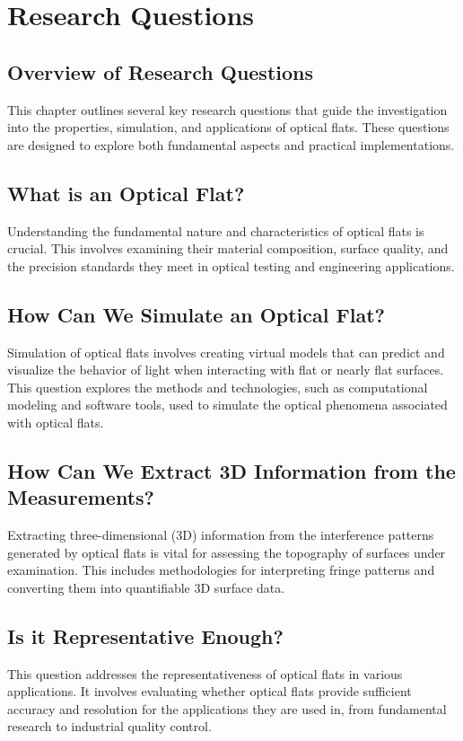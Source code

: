 \documentclass[../main.tex]{subfiles}
\begin{document}
\chapter{Research Questions}

\section{Overview of Research Questions}
This chapter outlines several key research questions that guide the investigation into the properties, simulation, and applications of optical flats. These questions are designed to explore both fundamental aspects and practical implementations.

\section{What is an Optical Flat?}
Understanding the fundamental nature and characteristics of optical flats is crucial. This involves examining their material composition, surface quality, and the precision standards they meet in optical testing and engineering applications.

\section{How Can We Simulate an Optical Flat?}
Simulation of optical flats involves creating virtual models that can predict and visualize the behavior of light when interacting with flat or nearly flat surfaces. This question explores the methods and technologies, such as computational modeling and software tools, used to simulate the optical phenomena associated with optical flats.

\section{How Can We Extract 3D Information from the Measurements?}
Extracting three-dimensional (3D) information from the interference patterns generated by optical flats is vital for assessing the topography of surfaces under examination. This includes methodologies for interpreting fringe patterns and converting them into quantifiable 3D surface data.

\section{Is it Representative Enough?}
This question addresses the representativeness of optical flats in various applications. It involves evaluating whether optical flats provide sufficient accuracy and resolution for the applications they are used in, from fundamental research to industrial quality control.
\end{document}
